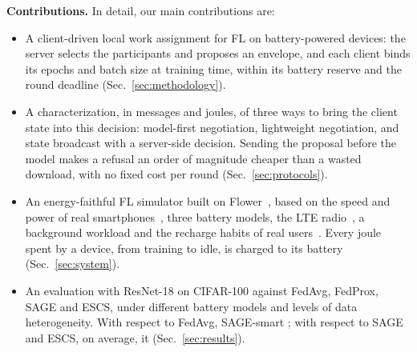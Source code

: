 \textbf{Contributions.} In detail, our main contributions are:
\begin{itemize}
  \item A client-driven local work assignment for FL on battery-powered
  devices: the server selects the participants and proposes an envelope, and
  each client binds its epochs and batch size at training time, within its
  battery reserve and the round deadline (Sec.~\ref{sec:methodology}).
  \item A characterization, in messages and joules, of three ways to bring
  the client state into this decision: model-first negotiation, lightweight
  negotiation, and state broadcast with a server-side decision. Sending the
  proposal before the model makes a refusal an order of magnitude cheaper
  than a wasted download, with no fixed cost per round
  (Sec.~\ref{sec:protocols}).
  \item An energy-faithful FL simulator built on Flower~\cite{beutel2020flower},
  based on the speed and power of real smartphones~\cite{xu2022mandheling},
  three battery models, the LTE radio~\cite{huang2012lte,narayanan2021variegated},
  a background workload and the recharge habits of real
  users~\cite{ferreira2011battery}. Every joule spent by a device, from
  training to idle, is charged to its battery (Sec.~\ref{sec:system}).
  \item An evaluation with ResNet-18 on CIFAR-100 against FedAvg, FedProx,
  SAGE and ESCS, under different battery models and levels of data
  heterogeneity. With respect to FedAvg, SAGE-smart ; with
  respect to SAGE and ESCS, on average, it  (Sec.~\ref{sec:results}).
\end{itemize}
